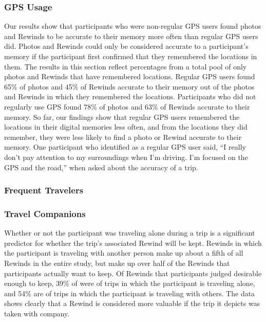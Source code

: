 \documentclass{sigchi}
\begin{document}
\subsubsection{GPS Usage}
Our results show that participants who were non-regular GPS users found photos and Rewinds to be accurate to their memory more often than regular GPS users did. Photos and Rewinds could only be considered accurate to a participant's memory if the participant first confirmed that they remembered the locations in them. The results in this section reflect percentages from a total pool of only photos and Rewinds that have remembered locations. Regular GPS users found 65\% of photos and 45\% of Rewinds accurate to their memory out of the photos and Rewinds in which they remembered the locations. Participants who did not regularly use GPS found 78\% of photos and 63\% of Rewinds accurate to their memory. So far, our findings show that regular GPS users remembered the locations in their digital memories less often, and from the locations they did remember, they were less likely to find a photo or Rewind accurate to their memory. One participant who identified as a regular GPS user said, ``I really don't pay attention to my surroundings when I'm driving. I'm focused on the GPS and the road,'' when asked about the accuracy of a trip.


\subsubsection{Frequent Travelers}



\subsubsection{Travel Companions}
Whether or not the participant was traveling alone during a trip is a significant predictor for whether the trip's associated Rewind will be kept. Rewinds in which the participant is traveling with another person make up about a fifth of all Rewinds in the entire study, but make up over half of the Rewinds that participants actually want to keep. Of Rewinds that participants judged desirable enough to keep, 39\% of were of trips in which the participant is traveling alone, and 54\% are of trips in which the participant is traveling with others. The data shows clearly that a Rewind is considered more valuable if the trip it depicts was taken with company. 
\end{document}
